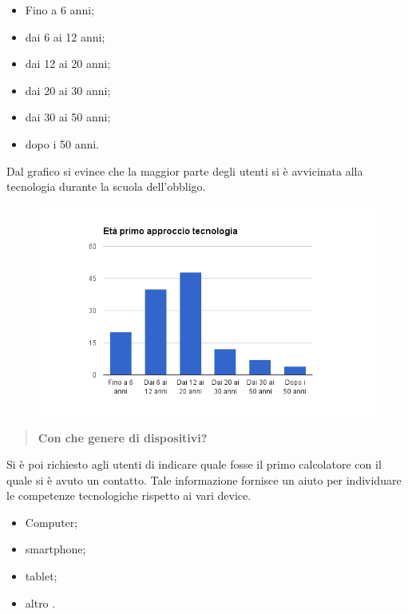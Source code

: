 \begin{itemize}
	\item Fino a 6 anni;
	\item dai 6 ai 12 anni;
	\item dai 12 ai 20 anni;
	\item dai 20 ai 30 anni;
	\item dai 30 ai 50 anni;
	\item dopo i 50 anni.
\end{itemize}

Dal grafico si evince che la maggior parte degli utenti si è avvicinata alla
tecnologia durante la scuola dell'obbligo.

\begin{figure}[H]
	\centering
	\includegraphics[scale=0.6]{img/chart_eta_primo_approccio}
\end{figure}

\begin{quote}
	\textbf{Con che genere di dispositivi?}
\end{quote}

Si è poi richiesto agli utenti di indicare quale fosse il primo calcolatore con il quale si è avuto
un contatto. Tale informazione fornisce un aiuto per individuare le competenze tecnologiche rispetto ai vari device.

\begin{itemize}
	\item Computer;
	\item smartphone;
	\item tablet;
	\item altro .
\end{itemize}

